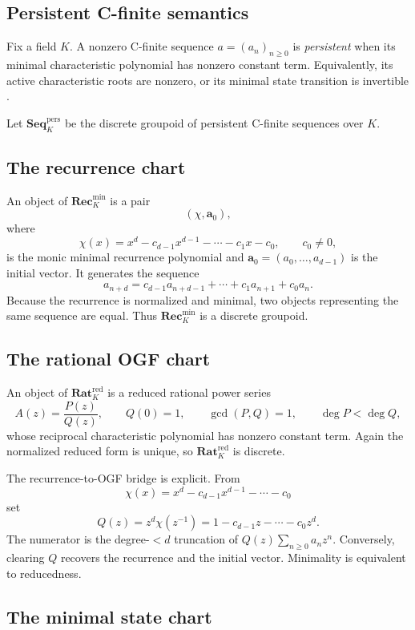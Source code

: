 \documentclass[11pt]{article}
\theoremstyle{definition}
\theoremstyle{remark}
\newcommand{\Seq}{\mathbf{Seq}}
\newcommand{\Rat}{\mathbf{Rat}}
\newcommand{\Rec}{\mathbf{Rec}}
\begin{document}
\subsection{Persistent C-finite semantics}

Fix a field \(K\). A nonzero C-finite sequence \(a=(a_n)_{n\ge0}\) is \emph{persistent} when its minimal characteristic polynomial has nonzero constant term. Equivalently, its active characteristic roots are nonzero, or its minimal state transition is invertible \cite{SEQ}.

Let \(\Seq_K^{\mathrm{pers}}\) be the discrete groupoid of persistent C-finite sequences over \(K\).

\subsection{The recurrence chart}

An object of \(\Rec_K^{\mathrm{min}}\) is a pair
\[
(\chi,\mathbf a_0),
\]
where
\[
\chi(x)=x^d-c_{d-1}x^{d-1}-\cdots-c_1x-c_0,
\qquad c_0\ne0,
\]
is the monic minimal recurrence polynomial and \(\mathbf a_0=(a_0,\dots,a_{d-1})\) is the initial vector. It generates the sequence
\[
a_{n+d}=c_{d-1}a_{n+d-1}+\cdots+c_1a_{n+1}+c_0a_n.
\]
Because the recurrence is normalized and minimal, two objects representing the same sequence are equal. Thus \(\Rec_K^{\mathrm{min}}\) is a discrete groupoid.

\subsection{The rational OGF chart}

An object of \(\Rat_K^{\mathrm{red}}\) is a reduced rational power series
\[
A(z)=\frac{P(z)}{Q(z)},
\qquad
Q(0)=1,
\qquad
\gcd(P,Q)=1,
\qquad
\deg P<\deg Q,
\]
whose reciprocal characteristic polynomial has nonzero constant term. Again the normalized reduced form is unique, so \(\Rat_K^{\mathrm{red}}\) is discrete.

The recurrence-to-OGF bridge is explicit. From
\[
\chi(x)=x^d-c_{d-1}x^{d-1}-\cdots-c_0
\]
set
\[
Q(z)=z^d\chi(z^{-1})
=1-c_{d-1}z-\cdots-c_0z^d.
\]
The numerator is the degree-\(<d\) truncation of \(Q(z)\sum_{n\ge0}a_nz^n\). Conversely, clearing \(Q\) recovers the recurrence and the initial vector. Minimality is equivalent to reducedness.

\subsection{The minimal state chart}
\end{document}
